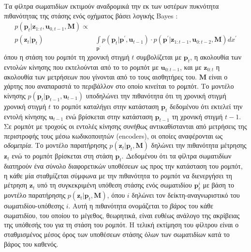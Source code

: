 Τα φίλτρα σωματιδίων εκτιμούν αναδρομικά την εκ των υστέρων πυκνότητα
πιθανότητας της στάσης ενός οχήματος βάσει λογικής Bayes
\cite{thrun2005probabilistic}:
\begin{align}
  \label{eq:pf_posterior}
  p(\bm{p}_t | \bm{z}_{1:t}, \bm{u}_{0,t-1}, \bm{M}) \propto & \nonumber \\
    p(\bm{z}_t | \bm{p}_t) &\int\limits_{\bm{p}^{\prime}} p(\bm{p}_t | \bm{p}^{\prime}, \bm{u}_{t-1}) \cdot p(\bm{p}^{\prime} | \bm{z}_{1:t-1}, \bm{u}_{0:t-2}, \bm{M}) dx^{\prime}
\end{align}
όπου η στάση του ρομπότ τη χρονική στιγμή $t$ συμβολίζεται με $\bm{p}_t$, η
ακολουθία των εντολών κίνησης που εκτελούνται από το το ρομπότ με
$\bm{u}_{0:t-1}$, και με $\bm{z}_{0:t}$ η ακολουθία των μετρήσεων που
γίνονται από το τους αισθητήρες του. $\bm{M}$ είναι ο χάρτης που αναπαραστά το
περιβάλλον στο οποίο κινείται το ρομπότ. Το μοντέλο κίνησης $p(\bm{p}_t |
\bm{p}_{t-1}, \bm{u}_{t-1})$ υποδηλώνει την πιθανότητα ότι τη χρονική στιγμή
χρονική στιγμή $t$ το ρομπότ καταλήγει στην κατάσταση $\bm{p}_t$ δεδομένου ότι
εκτελεί την εντολή κίνησης $\bm{u}_{t-1}$ ενώ βρίσκεται στην κατάσταση
$\bm{p}_{t-1}$ τη χρονική στιγμή $t-1$. Σε ρομπότ με τροχούς οι εντολές
κίνησης συνήθως αντικαθίστανται από μετρήσεις της περιστροφής τους μέσω
κωδικοποιητών (encoders), οι οποίες αναφέρονται ως \textit{οδομετρία}. Το
μοντέλο παρατήρησης $p(\bm{z}_t | \bm{p}_t, \bm{M})$ δηλώνει την πιθανότητα
μέτρησης $\bm{z}_t$ ενώ το ρομπότ βρίσκεται στη στάση $\bm{p}_t$.
Δεδομένου ότι τα φίλτρα σωματιδίων διατηρούν ένα σύνολο διαφορετικών υποθέσεων
ως προς την κατάσταση του ρομπότ, η κάθε μία σταθμίζεται σύμφωνα με την
πιθανότητα το ρομπότ να διενεργήσει τη μέτρηση $\bm{z}_t$ υπό τη συγκεκριμένη
υπόθεση στάσης ενός σωματιδίου $\bm{p}_t^i$ με βάση το μοντέλο παρατήρησης
$p(\bm{z}_t | \bm{p}_t, \bm{M})$, όπου $i$ δηλώνει τον δείκτη-αναγνωριστικό του
σωματιδίου-υπόθεσης $i$. Αυτή η πιθανότητα ονομάζεται το \textit{βάρος} του κάθε
σωματιδίου, του οποίου το μέγεθος, θεωρητικά, είναι ευθέως ανάλογο της ακρίβειας
της υπόθεσής του για τη στάση του ρομπότ. Η τελική εκτίμηση του φίλτρου είναι ο
σταθμισμένος μέσος όρος των υποθέσεων στάσης όλων των σωματιδίων κατά το βάρος
του καθενός.

